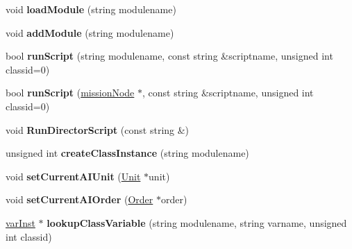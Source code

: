 \begin{DoxyCompactItemize}
\item 
void {\bfseries load\+Module} (string modulename)\hypertarget{classMission_ac0cb585ae7b32db5f6b0285d1c57a6aa}{}\label{classMission_ac0cb585ae7b32db5f6b0285d1c57a6aa}

\item 
void {\bfseries add\+Module} (string modulename)\hypertarget{classMission_a20bd32c2fedda2ecd66c9fa7543335e6}{}\label{classMission_a20bd32c2fedda2ecd66c9fa7543335e6}

\item 
bool {\bfseries run\+Script} (string modulename, const string \&scriptname, unsigned int classid=0)\hypertarget{classMission_a0f8aedf1154b39cbfeb29cde327eba3f}{}\label{classMission_a0f8aedf1154b39cbfeb29cde327eba3f}

\item 
bool {\bfseries run\+Script} (\hyperlink{classmissionNode}{mission\+Node} $\ast$, const string \&scriptname, unsigned int classid=0)\hypertarget{classMission_a6898878815157022da3cf1ae4296ba3e}{}\label{classMission_a6898878815157022da3cf1ae4296ba3e}

\item 
void {\bfseries Run\+Director\+Script} (const string \&)\hypertarget{classMission_a40b9333d56c96f5bfb1152b3b86d855c}{}\label{classMission_a40b9333d56c96f5bfb1152b3b86d855c}

\item 
unsigned int {\bfseries create\+Class\+Instance} (string modulename)\hypertarget{classMission_a48163c30a097fe3f5fe538b2f9268c97}{}\label{classMission_a48163c30a097fe3f5fe538b2f9268c97}

\item 
void {\bfseries set\+Current\+A\+I\+Unit} (\hyperlink{classUnit}{Unit} $\ast$unit)\hypertarget{classMission_a0825a12a731406a041bff7bdbe368d99}{}\label{classMission_a0825a12a731406a041bff7bdbe368d99}

\item 
void {\bfseries set\+Current\+A\+I\+Order} (\hyperlink{classOrder}{Order} $\ast$order)\hypertarget{classMission_a0eb9b81f2bde7f2c5be6f2193b7fdaa3}{}\label{classMission_a0eb9b81f2bde7f2c5be6f2193b7fdaa3}

\item 
\hyperlink{classvarInst}{var\+Inst} $\ast$ {\bfseries lookup\+Class\+Variable} (string modulename, string varname, unsigned int classid)\hypertarget{classMission_a9a915d634617b4eb3ceac8a638dc5d62}{}\label{classMission_a9a915d634617b4eb3ceac8a638dc5d62}


\end{DoxyCompactItemize}
